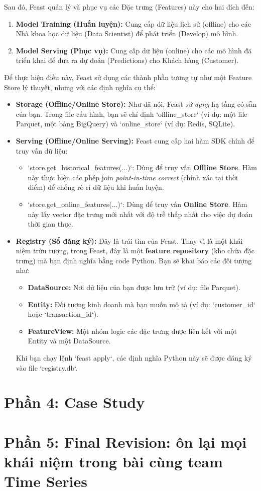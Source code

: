 \documentclass[11pt]{article}
\begin{document}
Sau đó, Feast quản lý và phục vụ các Đặc trưng (Features) này cho hai đích đến:
\begin{enumerate}
    \item \textbf{Model Training (Huấn luyện):} Cung cấp dữ liệu lịch sử (offline) cho các Nhà khoa học dữ liệu (Data Scientist) để phát triển (Develop) mô hình.
    \item \textbf{Model Serving (Phục vụ):} Cung cấp dữ liệu (online) cho các mô hình đã triển khai để đưa ra dự đoán (Predictions) cho Khách hàng (Customer).
\end{enumerate}

Để thực hiện điều này, Feast sử dụng các thành phần tương tự như một Feature Store lý thuyết, nhưng với các định nghĩa cụ thể:

\begin{itemize}
    \item \textbf{Storage (Offline/Online Store):} Như đã nói, Feast \textit{sử dụng} hạ tầng có sẵn của bạn. Trong file cấu hình, bạn sẽ chỉ định `offline\_store` (ví dụ: một file Parquet, một bảng BigQuery) và `online\_store` (ví dụ: Redis, SQLite).

    \item \textbf{Serving (Offline/Online Serving):} Feast cung cấp hai hàm SDK chính để truy vấn dữ liệu:
    \begin{itemize}
        \item `store.get\_historical\_features(...)`: Dùng để truy vấn \textbf{Offline Store}. Hàm này thực hiện các phép join \textit{point-in-time correct} (chính xác tại thời điểm) để chống rò rỉ dữ liệu khi huấn luyện.
        \item `store.get\_online\_features(...)`: Dùng để truy vấn \textbf{Online Store}. Hàm này lấy vector đặc trưng mới nhất với độ trễ thấp nhất cho việc dự đoán thời gian thực.
    \end{itemize}

    \item \textbf{Registry (Sổ đăng ký):} Đây là trái tim của Feast. Thay vì là một khái niệm trừu tượng, trong Feast, đây là một \textbf{feature repository} (kho chứa đặc trưng) mà bạn định nghĩa bằng code Python. Bạn sẽ khai báo các đối tượng như:
    \begin{itemize}
        \item \textbf{DataSource:} Nơi dữ liệu của bạn được lưu trữ (ví dụ: file Parquet).
        \item \textbf{Entity:} Đối tượng kinh doanh mà bạn muốn mô tả (ví dụ: `customer\_id` hoặc `transaction\_id`).
        \item \textbf{FeatureView:} Một nhóm logic các đặc trưng được liên kết với một Entity và một DataSource.
    \end{itemize}
    Khi bạn chạy lệnh `feast apply`, các định nghĩa Python này sẽ được đăng ký vào file `registry.db`.
\end{itemize}


\section{Phần 4: Case Study}


\section{Phần 5: Final Revision: ôn lại mọi khái niệm trong bài cùng team Time Series}


\printbibliography %
\end{document}
